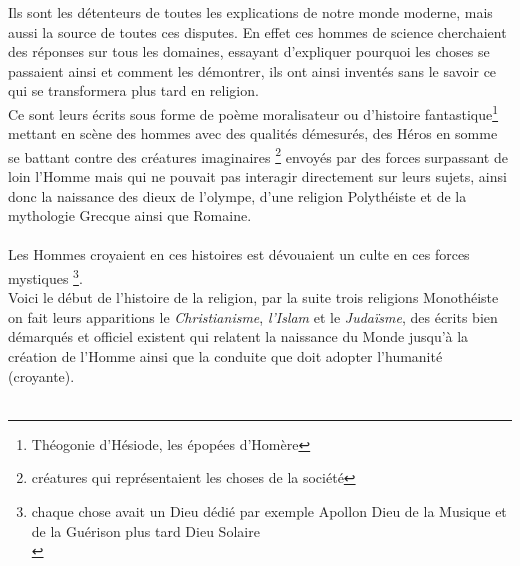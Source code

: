 \documentclass[twoside, openany]{report}
\begin{document}
	Ils sont les détenteurs de toutes les explications de notre 
	monde moderne, mais aussi la source de toutes ces disputes. En effet 
	ces hommes de science cherchaient des réponses sur tous les domaines, 
	essayant d'expliquer pourquoi les choses se passaient ainsi et comment les 
	démontrer, ils ont ainsi inventés sans le savoir ce qui se transformera 
	plus tard en religion.\\
	Ce sont leurs écrits sous forme de poème moralisateur ou d'histoire 
	fantastique\footnote{Théogonie d'Hésiode, les épopées d'Homère} mettant en 
	scène des hommes avec des qualités démesurés, des Héros en somme se battant 
	contre des créatures imaginaires \footnote{créatures qui représentaient les
	choses de la société} envoyés par des forces surpassant de loin l'Homme mais
	qui ne pouvait pas interagir directement sur leurs sujets, ainsi donc la 
	naissance des dieux de l'olympe, d'une religion Polythéiste et de la 
	mythologie Grecque ainsi que Romaine.

\paragraph{}
	Les Hommes croyaient en ces histoires est dévouaient un culte en ces forces
	mystiques \footnote{chaque chose avait un Dieu dédié par exemple Apollon Dieu
	de la Musique et de la Guérison plus tard Dieu Solaire\\}.\\
	Voici le début de l'histoire de la religion, par la suite trois religions 
	Monothéiste on fait leurs apparitions le \textit{Christianisme}, 
	\textit{l'Islam} et le \textit{Judaïsme}, des écrits bien démarqués et 
	officiel existent qui relatent la naissance du Monde jusqu'à la création de
	l'Homme ainsi que la conduite que doit adopter l'humanité (croyante).\\ \\
\end{document}
